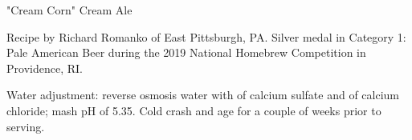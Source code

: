 \begin{recipe}{"Cream Corn" Cream Ale} %

\begin{aboutblock}
Recipe by Richard Romanko of East Pittsburgh, PA. Silver medal in Category
1: Pale American Beer during the 2019 National Homebrew Competition
in Providence, RI. \sourceaha
\end{aboutblock}
 

\begin{methodandtiming}
 
\begin{mashsteps}
\end{mashsteps}

\begin{directions}
Water adjustment: reverse osmosis water with  of calcium sulfate
and  of calcium chloride; mash pH of 5.35. Cold crash and age for
a couple of weeks prior to serving.
\end{directions}

\end{methodandtiming}

\recipebreak

\begin{ingredientsblock}

\begin{malts}
\end{malts}

\begin{hops}
\end{hops}


\end{ingredientsblock}

\end{recipe}

